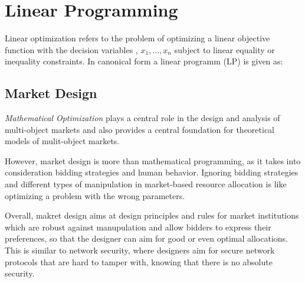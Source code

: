 
\section{Linear Programming}
Linear optimization refers to the problem of optimizing a linear objective function with the
decision variables , $x_{1}, ..., x_{n}$ subject to linear equality or inequality constraints. 
In canonical form a linear programm (LP) is given as:

\subsection{Market Design}


\textit{Mathematical Optimization} plays a central role in the design and analysis of multi-object 
markets and also provides a central foundation for theoretical models of mulit-object markets. 

However, market design is more than mathematical programming, as it takes into consideration bidding
strategies and human behavior. Ignoring bidding strategies and different types of manipulation 
in market-based resource allocation is like optimizing a problem with the wrong parameters. 

Overall, makret design aims at design principles and rules for market institutions which are robust
against manupulation and allow bidders to express their preferences, so that the designer can aim 
for good or even optimal allocations. This is similar to network security, where designers aim 
for secure network protocols that are hard to tamper with, 
knowing that there is no absolute security.